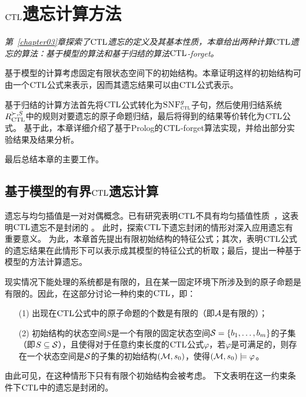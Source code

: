 
\chapter{$\textrm{CTL}$遗忘计算方法}
\label{chapter05}
{\em 第~\ref{chapter03}章探索了$\textrm{CTL}$遗忘的定义及其基本性质，本章给出两种计算$\textrm{CTL}$遗忘的算法：基于模型的算法和基于归结的算法$\textrm{CTL}$-forget。
	
	基于模型的计算考虑固定有限状态空间下的初始结构。本章证明这样的初始结构可由一个$\textrm{CTL}$公式来表示，因而其遗忘结果可以由$\textrm{CTL}$公式表示。

基于归结的计算方法首先将$\textrm{CTL}$公式转化为${\textsc{SNF}_{\textsc{ctl}}^g}$子句，然后使用归结系统$R_{\textrm{CTL}}^{\succ,S}$中的规则对要遗忘的原子命题归结，最后将得到的结果等价转化为$\textrm{CTL}$公式。
基于此，本章详细介绍了基于Prolog的$\textrm{CTL}$-forget算法实现，并给出部分实验结果及结果分析。

最后总结本章的主要工作。}

\section{基于模型的有界$\textrm{CTL}$遗忘计算}
\label{chapter05:sec:model}
	遗忘与均匀插值是一对对偶概念。已有研究表明$\textrm{CTL}$不具有均匀插值性质~\cite{Maksimova:JANCL:1991}，这表明$\textrm{CTL}$遗忘不是封闭的
	。
	此时，探索$\textrm{CTL}$下遗忘封闭的情形对深入应用遗忘有重要意义。
	为此，本章首先提出有限初始结构的特征公式；其次，表明$\textrm{CTL}$公式的遗忘结果在此情形下可以表示成其模型的特征公式的析取；最后，提出一种基于模型的方法计算遗忘。%





现实情况下能处理的系统都是有限的，且在某一固定环境下所涉及到的原子命题是有限的。因此，在这部分讨论一种约束的$\textrm{CTL}$，即：
\begin{itemize}
	\item[(1)] 出现在$\textrm{CTL}$公式中的原子命题的个数是有限的（即${\cal A}$是有限的）；
	\item[(2)] 初始结构的状态空间$S$是一个有限的固定状态空间${\cal S}=\{b_1,\ldots,b_m\}$的子集（即$S \subseteq {\cal S}$），且使得对于任意约束长度的$\textrm{CTL}$公式$\varphi$，若$\varphi$是可满足的，则存在一个状态空间是${\cal S}$的子集的初始结构$({\cal M},s_0)$，使得$({\cal M},s_0)\models \varphi$。
\end{itemize}
由此可见，在这种情形下只有有限个初始结构会被考虑。
下文表明在这一约束条件下$\textrm{CTL}$中的遗忘是封闭的。

